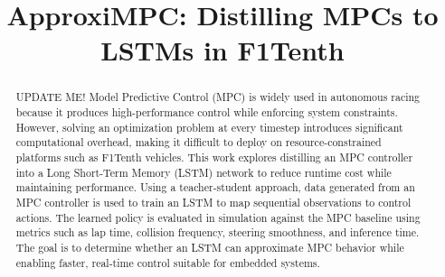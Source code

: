 \documentclass[conference]{IEEEtran}
\begin{document}
\title{ApproxiMPC: Distilling MPCs to LSTMs in F1Tenth}

\author{
\and
{}
\and
{}
\and
{}
}

\maketitle

\begin{abstract}
UPDATE ME! Model Predictive Control (MPC) is widely used in autonomous racing because it produces high-performance control while enforcing system constraints. However, solving an optimization problem at every timestep introduces significant computational overhead, making it difficult to deploy on resource-constrained platforms such as F1Tenth vehicles. This work explores distilling an MPC controller into a Long Short-Term Memory (LSTM) network to reduce runtime cost while maintaining performance. Using a teacher-student approach, data generated from an MPC controller is used to train an LSTM to map sequential observations to control actions. The learned policy is evaluated in simulation against the MPC baseline using metrics such as lap time, collision frequency, steering smoothness, and inference time. The goal is to determine whether an LSTM can approximate MPC behavior while enabling faster, real-time control suitable for embedded systems.
\end{abstract}
\end{document}
